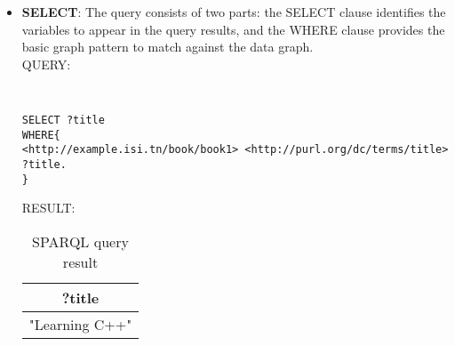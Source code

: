 \begin{itemize}

\item \textbf{SELECT}: The query consists of two parts: the SELECT clause identifies the variables to appear in the query results, and the WHERE clause provides the basic graph pattern to match against the data graph.\\



QUERY:
{\tt \small
\begin{verbatim}
SELECT ?title
WHERE{
<http://example.isi.tn/book/book1> <http://purl.org/dc/terms/title> ?title.
}  
\end{verbatim}
}

RESULT: 
\bigskip
\begin{table}[H]
\centering
\caption{SPARQL query result}
\label{my-label}
\begin{tabular}{|c|}
\hline
?title         \\ \hline
"Learning C++" \\ \hline
\end{tabular}
\end{table}


\end{itemize}
